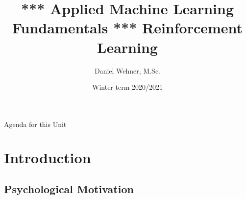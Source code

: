 


\title[Reinforcement Learning]{*** Applied Machine Learning Fundamentals *** Reinforcement Learning}
\author{Daniel Wehner, M.Sc.}
\date{Winter term 2020/2021}




\maketitlepage




\begin{frame}{Agenda for this Unit}
	\begin{multicols}{2}
		\tableofcontents
	\end{multicols}
\end{frame}


\section{Introduction}

\subsection{Psychological Motivation}

